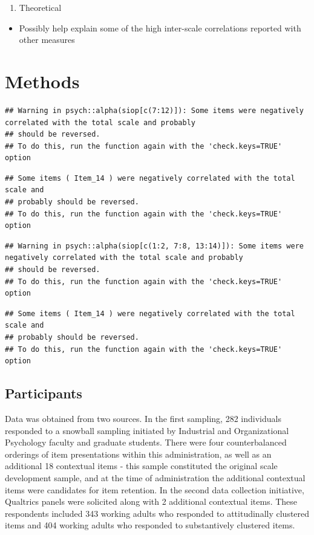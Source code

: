 \documentclass[
  man]{apa6}
\providecommand{\tightlist}{%
  \setlength{\itemsep}{0pt}\setlength{\parskip}{0pt}}
\begin{document}
\begin{enumerate}
\def\labelenumi{\arabic{enumi}.}
\setcounter{enumi}{2}
\tightlist
\item
  Theoretical
\end{enumerate}

\begin{itemize}
\tightlist
\item
  Possibly help explain some of the high inter-scale correlations reported with other measures
\end{itemize}

\hypertarget{methods}{%
\section{Methods}\label{methods}}

\begin{verbatim}
## Warning in psych::alpha(siop[c(7:12)]): Some items were negatively correlated with the total scale and probably 
## should be reversed.  
## To do this, run the function again with the 'check.keys=TRUE' option
\end{verbatim}

\begin{verbatim}
## Some items ( Item_14 ) were negatively correlated with the total scale and 
## probably should be reversed.  
## To do this, run the function again with the 'check.keys=TRUE' option
\end{verbatim}

\begin{verbatim}
## Warning in psych::alpha(siop[c(1:2, 7:8, 13:14)]): Some items were negatively correlated with the total scale and probably 
## should be reversed.  
## To do this, run the function again with the 'check.keys=TRUE' option
\end{verbatim}

\begin{verbatim}
## Some items ( Item_14 ) were negatively correlated with the total scale and 
## probably should be reversed.  
## To do this, run the function again with the 'check.keys=TRUE' option
\end{verbatim}

\hypertarget{participants}{%
\subsection{Participants}\label{participants}}

Data was obtained from two sources. In the first sampling, 282 individuals responded to a snowball sampling initiated by Industrial and Organizational Psychology faculty and graduate students. There were four counterbalanced orderings of item presentations within this administration, as well as an additional 18 contextual items - this sample constituted the original scale development sample, and at the time of administration the additional contextual items were candidates for item retention. In the second data collection initiative, Qualtrics panels were solicited along with 2 additional contextual items. These respondents included 343 working adults who responded to attitudinally clustered items and 404 working adults who responded to substantively clustered items.
\end{document}
